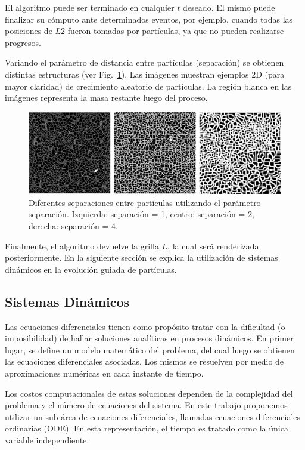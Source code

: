 \documentclass[oneside,a4paper,spanish,links]{amca}
\begin{document}
El algoritmo puede ser terminado en cualquier $t$ deseado. El mismo puede finalizar su c\'omputo ante determinados eventos, por ejemplo, cuando todas las posiciones de $L2$ fueron tomadas por part\'iculas, ya que no pueden realizarse progresos.

Variando el par\'ametro de distancia entre part\'iculas (separación) se obtienen distintas estructuras (ver Fig.~\ref{fg:fig1}). Las im\'agenes muestran ejemplos 2D (para mayor claridad) de crecimiento aleatorio de part\'iculas. La regi\'on blanca en las im\'agenes representa la masa restante luego del proceso.


\begin{figure}[htb!]
  \centerline{\includegraphics[scale=0.22]{fig1.pdf}}
  \caption{Diferentes separaciones entre part\'iculas utilizando el par\'ametro separación. Izquierda: separaci\'on = 1, centro: separaci\'on = 2, derecha: separaci\'on = 4.}
  \label{fg:fig1}
\end{figure}

Finalmente, el algoritmo devuelve la grilla $L$, la cual ser\'a renderizada posteriormente. En la siguiente secci\'on se explica la utilizaci\'on de sistemas din\'amicos en la evoluci\'on guiada de part\'iculas.

\subsection{Sistemas Din\'amicos}

Las ecuaciones diferenciales tienen como prop\'osito tratar con la dificultad (o imposibilidad) de hallar soluciones anal\'iticas en procesos din\'amicos. En primer lugar, se define un modelo matem\'atico del problema, del cual luego se obtienen 
las ecuaciones diferenciales asociadas. Los mismos se resuelven por medio de aproximaciones num\'ericas en cada instante de tiempo.

Los costos computacionales de estas soluciones dependen de la complejidad del problema y el n\'umero de ecuaciones del sistema. En este trabajo proponemos utilizar un sub-\'area de ecuaciones diferenciales, llamadas ecuaciones diferenciales ordinarias (ODE). En esta representaci\'on, el tiempo es tratado como la \'unica variable independiente.
\end{document}
